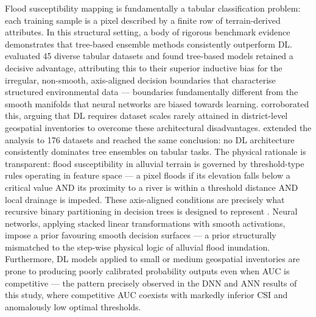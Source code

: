 \documentclass[12pt, a4paper]{article}
\begin{document}
Flood susceptibility mapping is fundamentally a tabular classification problem: each training sample is a pixel described by a finite row of terrain-derived attributes. In this structural setting, a body of rigorous benchmark evidence demonstrates that tree-based ensemble methods consistently outperform DL. \citet{grinsztajn2022} evaluated 45 diverse tabular datasets and found tree-based models retained a decisive advantage, attributing this to their superior inductive bias for the irregular, non-smooth, axis-aligned decision boundaries that characterise structured environmental data --- boundaries fundamentally different from the smooth manifolds that neural networks are biased towards learning. \citet{shwartzziv2022} corroborated this, arguing that DL requires dataset scales rarely attained in district-level geospatial inventories to overcome these architectural disadvantages. \citet{mcelfresh2023} extended the analysis to 176 datasets and reached the same conclusion: no DL architecture consistently dominates tree ensembles on tabular tasks. The physical rationale is transparent: flood susceptibility in alluvial terrain is governed by threshold-type rules operating in feature space --- a pixel floods if its elevation falls below a critical value AND its proximity to a river is within a threshold distance AND local drainage is impeded. These axis-aligned conditions are precisely what recursive binary partitioning in decision trees is designed to represent \citep{breiman2001, Popov2021}. Neural networks, applying stacked linear transformations with smooth activations, impose a prior favouring smooth decision surfaces --- a prior structurally mismatched to the step-wise physical logic of alluvial flood inundation. Furthermore, DL models applied to small or medium geospatial inventories are prone to producing poorly calibrated probability outputs even when AUC is competitive \citep{Niculescu-Mizil2005, zadrozny2002} --- the pattern precisely observed in the DNN and ANN results of this study, where competitive AUC coexists with markedly inferior CSI and anomalously low optimal thresholds.
\end{document}
